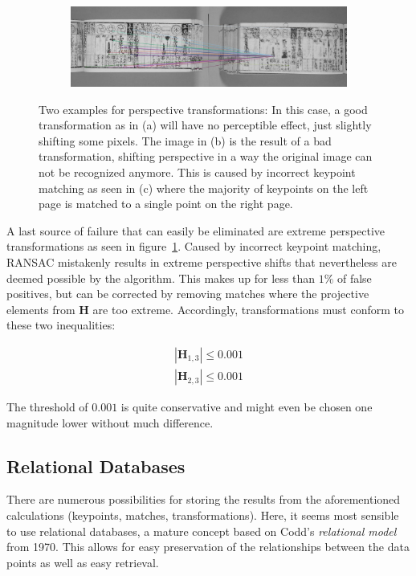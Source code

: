 \documentclass{ltjarticle}
\begin{document}
\begin{figure}
\begin{subfigure}{.49\textwidth}
        \caption{}
    \end{subfigure}
    \begin{subfigure}{\textwidth}
        \includegraphics[width=\textwidth]{homography-cause.jpg}
        \caption{}
    \end{subfigure}
    \caption[Perspective transformation examples]{Two examples for perspective transformations: In this case, a good transformation as in (a) will have no perceptible effect, just slightly shifting some pixels. The image in (b) is the result of a bad transformation, shifting perspective in a way the original image can not be recognized anymore. This is caused by incorrect keypoint matching as seen in (c) where the majority of keypoints on the left page is matched to a single point on the right page.}
    \label{fig:homography-compare}
\end{figure}

A last source of failure that can easily be eliminated are extreme perspective transformations as seen in figure~\ref{fig:homography-compare}. Caused by incorrect keypoint matching, RANSAC mistakenly results in extreme perspective shifts that nevertheless are deemed possible by the algorithm. This makes up for less than $1\%$ of false positives, but can be corrected by removing matches where the projective elements from $\mathbf{H}$ are too extreme. Accordingly, transformations must conform to these two inequalities:

\begin{gather*}
    |\mathbf{H}_{1,3}| \leq 0.001\\
    |\mathbf{H}_{2,3}| \leq 0.001
\end{gather*}

The threshold of $0.001$ is quite conservative and might even be chosen one magnitude lower without much difference.

\subsection{Relational Databases}

There are numerous possibilities for storing the results from the aforementioned calculations (keypoints, matches, transformations). Here, it seems most sensible to use relational databases, a mature concept based on Codd's \emph{relational model} from 1970.\cite{codd1970relational} This allows for easy preservation of the relationships between the data points as well as easy retrieval.
\end{document}
